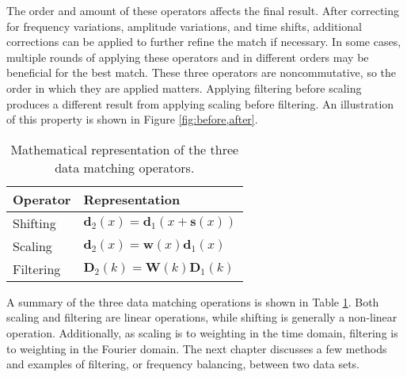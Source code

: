 The order and amount of these operators affects the final result.
After correcting for frequency variations, amplitude variations, and time shifts, additional corrections can be applied to further refine the match if necessary.
In some cases, multiple rounds of applying these operators and in different orders may be beneficial for the best match.
These three operators are noncommutative, so the order in which they are applied matters.
Applying filtering before scaling produces a different result from applying scaling before filtering. 
An illustration of this property is shown in Figure \ref{fig:before,after}.


\begin{table}[h]
\centering
\begin{tabular}{l|l}
\textbf{Operator} & \textbf{Representation} \\ \hline
        Shifting          & $\mathbf{d}_2(x) = \mathbf{d}_1(x + \mathbf{s}(x))$\\
        Scaling           & $\mathbf{d}_2(x) = \mathbf{w}(x)\mathbf{d}_1(x)$\\
        Filtering         & $\mathbf{D}_2(k) = \mathbf{W}(k)\mathbf{D}_1(k)$
\end{tabular}
\caption{Mathematical representation of the three data matching operators.}
\label{op}
\end{table}

A summary of the three data matching operations is shown in Table \ref{op}.
Both scaling and filtering are linear operations, while shifting is generally a non-linear operation.
Additionally, as scaling is to weighting in the time domain, filtering is to weighting in the Fourier domain.
The next chapter discusses a few methods and examples of filtering, or frequency balancing, between two data sets.
